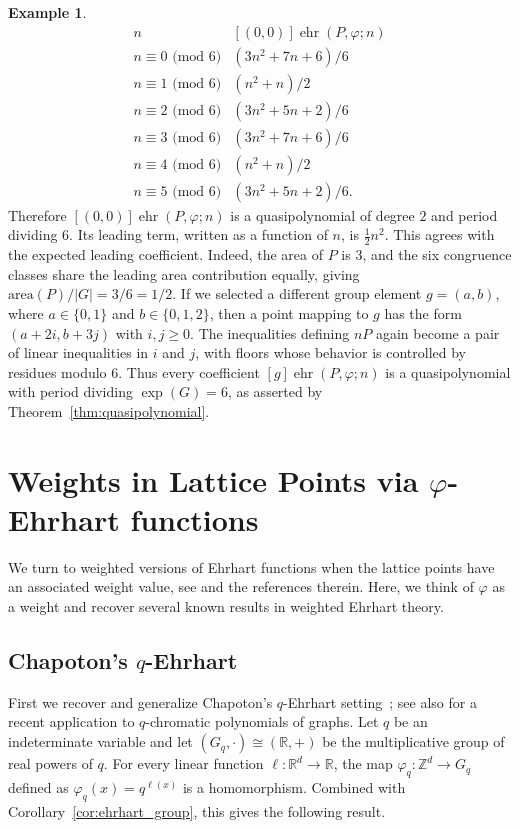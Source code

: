 \documentclass[12pt,reqno]{amsart}
\theoremstyle{definition}
\newtheorem{exam}[thm]{Example}
\theoremstyle{remark}
\newcommand{\R}{\mathbb{R}}
\newcommand{\Z}{\mathbb{Z}}
\renewcommand{\phi}{\varphi}
\DeclareMathOperator{\ehr}{ehr}
\begin{document}
\begin{exam}
\[
\begin{array}{c|c}
n & [(0,0)]\ehr(P,\varphi;n) \\ \hline
n \equiv 0 \text{ (mod } 6) & (3n^2+7n+6)/6 \\
n \equiv 1 \text{ (mod } 6) & (n^2+n)/2 \\
n \equiv 2 \text{ (mod } 6) & (3n^2+5n+2)/6 \\
n \equiv 3 \text{ (mod } 6) & (3n^2+7n+6)/6 \\
n \equiv 4 \text{ (mod } 6) & (n^2+n)/2 \\
n \equiv 5 \text{ (mod } 6) & (3n^2+5n+2)/6.
\end{array}
\]
Therefore $[(0,0)]\ehr(P,\varphi;n)$ is a quasipolynomial of degree $2$ and period dividing $6$. Its leading term, written as a function of $n$, is $\frac12 n^2$. This agrees with the expected leading coefficient. Indeed, the area of $P$ is $3$, and the six congruence classes share the leading area contribution equally, giving $\text{area}(P)/|G|=3/6=1/2$. If we selected a different group element $g=(a,b)$, where $a\in\{0,1\}$ and $b\in\{0,1,2\}$, then a point mapping to $g$ has the form $(a+2i,b+3j)$ with $i,j\geq 0$. The inequalities defining $nP$ again become a pair of linear inequalities in $i$ and $j$, with floors whose behavior is controlled by residues modulo $6$. Thus every coefficient $[g]\ehr(P,\varphi;n)$ is a quasipolynomial with period dividing $\exp(G)=6$, as asserted by Theorem~\ref{thm:quasipolynomial}.
\end{exam}


\section{Weights in Lattice Points via $\phi$-Ehrhart functions} \label{sec:recoverweighted}


We turn to weighted versions of Ehrhart functions when the lattice points have an associated weight value, 
see \cite{Weighted_Bajo_etal,chapoton_2016,quasiweightsfpsac2023,deloera2024weighted} and the references therein. Here, we think of $\phi$ as a weight and recover several known results in weighted Ehrhart theory.

\subsection{Chapoton's $q$-Ehrhart}

First we recover and generalize Chapoton's $q$-Ehrhart setting~\cite{chapoton_2016}; see also \cite{bajo2026} for a recent application to $q$-chromatic polynomials of graphs.
Let $q$ be an indeterminate variable and let $(G_q, \cdot) \cong (\R,+) $ be the multiplicative group of real powers of $q$. For every linear function $\ell:\R^d\to \R$, the map $\phi_q:\Z^d\to G_q$ defined as $\phi_q(x)=q^{\ell(x)}$ is a homomorphism. Combined with Corollary~\ref{cor:ehrhart_group}, this gives the following result.
\end{document}
